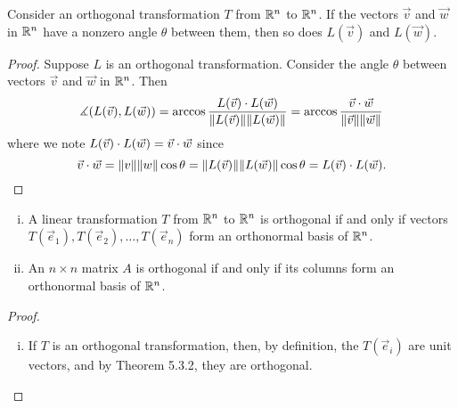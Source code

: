 \documentclass[a4paper,8pt]{article}
\begin{document}
\begin{outline}
    Consider an orthogonal transformation \(T\) from \(\mathbb{R}^n\) to \(\mathbb{R}^n\). If the vectors \(\vec{v}\) and \(\vec{w}\) in
    \(\mathbb{R}^n\) have a nonzero angle \(\theta\) between them, then so does \(L(\vec{v})\) and \(L(\vec{w})\).

    \begin{proof}
      Suppose \(L\) is an orthogonal transformation. Consider the angle \(\theta\) between vectors \(\vec{v}\) and \(\vec{w}\)
      in \(\mathbb{R}^n\). Then
      \[
        \measuredangle (L(\vec{v}), L(\vec{w}))
          = \arccos{\frac{L(\vec{v})\cdot L(\vec{w})}{\|L(\vec{v})\|\|L(\vec{w})\|}}
          = \arccos{\frac{\vec{v}\cdot\vec{w}}{\|\vec{v}\|\|\vec{w}\|}}
      \]
      where we note \(L(\vec{v})\cdot L(\vec{w}) = \vec{v}\cdot\vec{w}\) since
      \[
        \vec{v}\cdot\vec{w} = \|v\|\|w\|\cos{\theta} = \|L(\vec{v})\|\|L(\vec{w})\|\cos{\theta} = L(\vec{v})\cdot L(\vec{w})\text{.}
      \]

    \end{proof}

    \begin{enumerate}[i.]
      \item
        A linear transformation \(T\) from \(\mathbb{R}^n\) to \(\mathbb{R}^n\) is orthogonal if and only if vectors \(T(\vec{e}_1),
        T(\vec{e}_2), \ldots, T(\vec{e}_n)\) form an orthonormal basis of \(\mathbb{R}^n\).
      \item
        An \(n\times n\) matrix \(A\) is orthogonal if and only if its columns form an orthonormal basis of \(\mathbb{R}^n\).
    \end{enumerate}

    \begin{proof}
      \begin{enumerate}[i.]
        \item
          \forward If \(T\) is an orthogonal transformation, then, by definition, the \(T(\vec{e}_i)\) are unit vectors, and by
          Theorem 5.3.2, they are orthogonal.


\end{enumerate}
\end{proof}
\end{outline}
\end{document}
